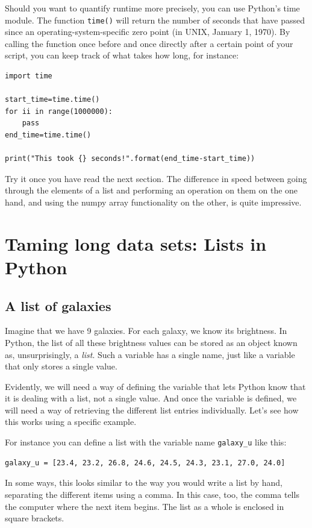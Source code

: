 \documentclass[twocolumn,apj]{openjournal}
\begin{document}
Should you want to quantify runtime more precisely, you can use Python's time module. The function \verb|time()| will return the number of seconds that have passed since an operating-system-specific zero point (in UNIX, January 1, 1970). By calling the function once before and once directly after a certain point of your script, you can keep track of what takes how long, for instance:
\begin{lstlisting}
import time

start_time=time.time()
for ii in range(1000000):
	pass
end_time=time.time()

print("This took {} seconds!".format(end_time-start_time))
\end{lstlisting}
Try it once you have read the next section. The difference in speed between going through the elements of a list and performing an operation on them on the one hand, and using the numpy array functionality on the other, is quite impressive. 

\section{Taming long data sets: Lists in Python}
\label{Lists}

\subsection{A list of galaxies}

Imagine that we have 9 galaxies. For each galaxy, we know its brightness. In Python, the list of all these brightness values can be stored as an object known as, unsurprisingly, a {\em list}. Such a variable has a single name, just like a variable that only stores a single value. 

Evidently, we will need a way of defining the variable that lets Python know that it is dealing with a list, not a single value. And once the variable is defined, we will need a way of retrieving the different list entries individually. Let's see how this works using a specific example.

For instance you can define a list with the variable name \verb|galaxy_u| like this:
\begin{lstlisting}
galaxy_u = [23.4, 23.2, 26.8, 24.6, 24.5, 24.3, 23.1, 27.0, 24.0]
\end{lstlisting}
In some ways, this looks similar to the way you would write a list by hand, separating the different items using a comma. In this case, too, the comma tells the computer where the next item begins. The list as a whole is enclosed in square brackets.
\end{document}
